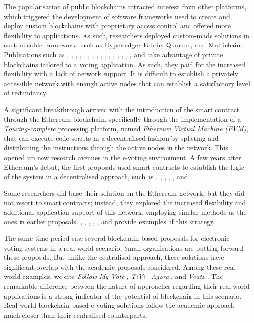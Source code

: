 \documentclass[../main.tex]{subfiles}
\begin{document}
\par
The popularisation of public blockchains attracted interest from other platforms, which triggered the development of software frameworks used to create and deploy custom blockchains with proprietary access control and offered more flexibility to applications. As such, researchers deployed custom-made solutions in customisable frameworks such as Hyperledger Fabric, Quorum, and Multichain. Publications such as \cite{Kirby2016}, \cite{BenAyed2017}, \cite{Chaieb2018}, \cite{Burhanuddin2018}, \cite{Zhang2018}, \cite{Khan2018}, \cite{Murtaza2019}, \cite{Faour2019}, \cite{Killer2020}, \cite{Han2020}, \cite{Vivek2020}, \cite{Mani2022}, \cite{Zhou2020}, \cite{Alvi2022}, \cite{Hassan2022}, \cite{Vidwans2022}, and \cite{Matile2019} take advantage of private blockchains tailored to a voting application. As such, they paid for the increased flexibility with a lack of network support. It is difficult to establish a privately accessible network with enough active nodes that can establish a satisfactory level of redundancy.
\par
A significant breakthrough arrived with the introduction of the smart contract through the Ethereum blockchain, specifically through the implementation of a \textit{Touring-complete} processing platform, named \textit{Ethereum Virtual Machine (EVM)}, that can execute code scripts in a decentralised fashion by splitting and distributing the instructions through the active nodes in the network. This opened up new research avenues in the e-voting environment. A few years after Ethereum's debut, the first proposals used smart contracts to establish the logic of the system in a decentralised approach, such as \cite{McCorry2017}, \cite{Koc2018}, \cite{Dagher2018}, \cite{Fusco2018}, \cite{Hjalmarsson2018}, and \cite{Mols2020}.
\par
Some researchers did base their solution on the Ethereum network, but they did not resort to smart contracts; instead, they explored the increased flexibility and additional application support of this network, employing similar methods as the ones in earlier proposals. \cite{Hardwick2018}, \cite{Wang2018}, \cite{Hsiao2018}, \cite{Lai2018}, \cite{Shukla2018}, and \cite{Vo-Cao-Thuy2019} provide examples of this strategy.
\par
The same time period saw several blockchain-based proposals for electronic voting systems in a real-world scenario. Small organisations are putting forward these proposals. But unlike the centralised approach, these solutions have significant overlap with the academic proposals considered. Among these real-world examples, we cite \textit{Follow My Vote} \cite{Ernest2021}, \textit{TiVi} \cite{TiVi2021}, \textit{Agora} \cite{AgoraWhitePaper2021}, and \textit{Voatz} \cite{Voatz2021}. The remarkable difference between the nature of approaches regarding their real-world applications is a strong indicator of the potential of blockchain in this scenario. Real-world blockchain-based e-voting solutions follow the academic approach much closer than their centralised counterparts.
\end{document}
